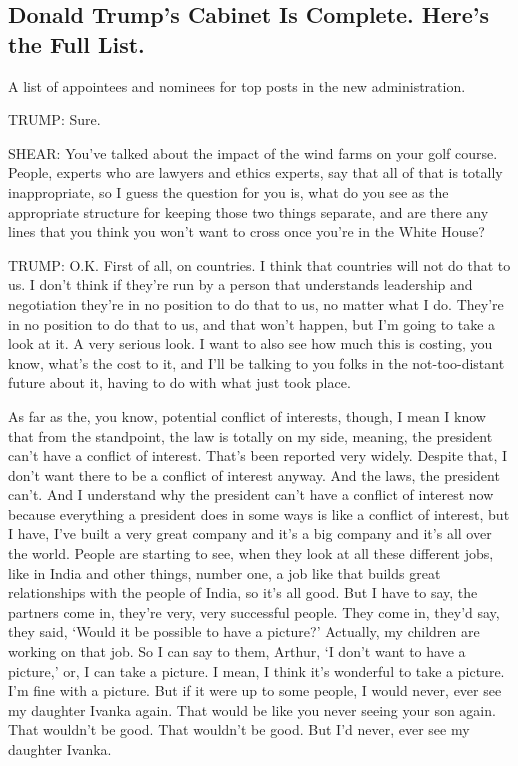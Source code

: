 \hypertarget{donald-trumps-cabinet-is-complete-heres-the-full-list}{%
\subsection{Donald Trump's Cabinet Is Complete. Here's the Full
List.}\label{donald-trumps-cabinet-is-complete-heres-the-full-list}}

A list of appointees and nominees for top posts in the new
administration.

TRUMP: Sure.

SHEAR: You've talked about the impact of the wind farms on your golf
course. People, experts who are lawyers and ethics experts, say that all
of that is totally inappropriate, so I guess the question for you is,
what do you see as the appropriate structure for keeping those two
things separate, and are there any lines that you think you won't want
to cross once you're in the White House?

TRUMP: O.K. First of all, on countries. I think that countries will not
do that to us. I don't think if they're run by a person that understands
leadership and negotiation they're in no position to do that to us, no
matter what I do. They're in no position to do that to us, and that
won't happen, but I'm going to take a look at it. A very serious look. I
want to also see how much this is costing, you know, what's the cost to
it, and I'll be talking to you folks in the not-too-distant future about
it, having to do with what just took place.

As far as the, you know, potential conflict of interests, though, I mean
I know that from the standpoint, the law is totally on my side, meaning,
the president can't have a conflict of interest. That's been reported
very widely. Despite that, I don't want there to be a conflict of
interest anyway. And the laws, the president can't. And I understand why
the president can't have a conflict of interest now because everything a
president does in some ways is like a conflict of interest, but I have,
I've built a very great company and it's a big company and it's all over
the world. People are starting to see, when they look at all these
different jobs, like in India and other things, number one, a job like
that builds great relationships with the people of India, so it's all
good. But I have to say, the partners come in, they're very, very
successful people. They come in, they'd say, they said, `Would it be
possible to have a picture?' Actually, my children are working on that
job. So I can say to them, Arthur, `I don't want to have a picture,' or,
I can take a picture. I mean, I think it's wonderful to take a picture.
I'm fine with a picture. But if it were up to some people, I would
never, ever see my daughter Ivanka again. That would be like you never
seeing your son again. That wouldn't be good. That wouldn't be good. But
I'd never, ever see my daughter Ivanka.

